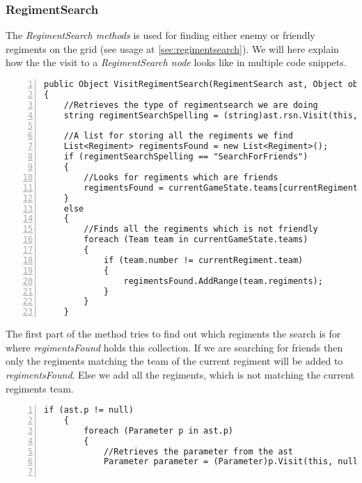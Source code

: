 {	\subsubsection{RegimentSearch}
		The {\it RegimentSearch methods} is used for finding either enemy or friendly regiments on the grid (see usage at \ref{sec:regimentsearch}). 
		We will here explain how the the visit to a {\it RegimentSearch node} looks like in multiple code snippets.
		\begin{lstlisting}[basicstyle=\small\sffamily,
			keywords={break,case,const,continue,default,else,enum,
			for,if,return,switch,while,do,long,void,int,float,double,
			char,struct,typedef,include,size\_t},
			keywordstyle={\color{blue}},
			comment={[l]{//}}, morecomment={[s]{/*}{*/}}, commentstyle=\itshape,
			columns={[l]flexible}, numbers=left, numberstyle=\tiny,
			frameround=fftt, frame=shadowbox, captionpos=b,
			caption={1. part of visit of RegimentSearch node in the class BehaviourInterpreter},
			label=impl:regsearch1]		
public Object VisitRegimentSearch(RegimentSearch ast, Object obj)
{
	//Retrieves the type of regimentsearch we are doing
	string regimentSearchSpelling = (string)ast.rsn.Visit(this, null);

	//A list for storing all the regiments we find
	List<Regiment> regimentsFound = new List<Regiment>();
	if (regimentSearchSpelling == "SearchForFriends")
	{
		//Looks for regiments which are friends
		regimentsFound = currentGameState.teams[currentRegiment.team].regiments;
	}
	else
	{
		//Finds all the regiments which is not friendly
		foreach (Team team in currentGameState.teams)
		{
			if (team.number != currentRegiment.team)
			{
				regimentsFound.AddRange(team.regiments);
			}
		}
	}
		\end{lstlisting}
		The first part of the method tries to find out which regiments the search is for where {\it regimentsFound} holds this collection. 
		If we are searching for friends then only the regiments matching the team of the current regiment will be added to {\it regimentsFound}.
		Else we add all the regiments, which is not matching the current regiments team.
		\begin{lstlisting}[basicstyle=\small\sffamily,
			keywords={break,case,const,continue,default,else,enum,
			for,if,return,switch,while,do,long,void,int,float,double,
			char,struct,typedef,include,size\_t},
			keywordstyle={\color{blue}},
			comment={[l]{//}}, morecomment={[s]{/*}{*/}}, commentstyle=\itshape,
			columns={[l]flexible}, numbers=left, numberstyle=\tiny,
			frameround=fftt, frame=shadowbox, captionpos=b,
			caption={1. part of visit of RegimentSearch node in the class BehaviourInterpreter},
			label=impl:regsearch2]
	if (ast.p != null)
	{
		foreach (Parameter p in ast.p)
		{
			//Retrieves the parameter from the ast
			Parameter parameter = (Parameter)p.Visit(this, null);


\end{lstlisting}}
